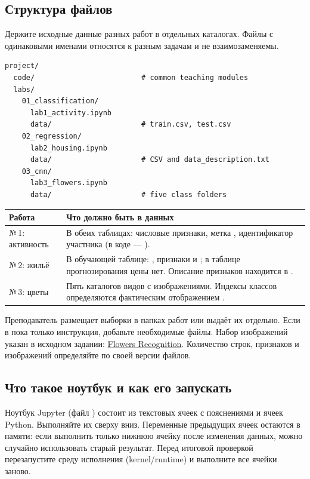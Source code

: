 \ifdefempty{\CompanionURL}{}{%
\noindent Электронное приложение к практикуму:\par
\noindent\expandafter\url\expandafter{\CompanionURL}\par\medskip}
\subsection*{Структура файлов}
Держите исходные данные разных работ в отдельных каталогах. Файлы с одинаковыми именами относятся к разным задачам и не взаимозаменяемы.
\begin{lstlisting}[language={}]
project/
  code/                         # common teaching modules
  labs/
    01_classification/
      lab1_activity.ipynb
      data/                     # train.csv, test.csv
    02_regression/
      lab2_housing.ipynb
      data/                     # CSV and data_description.txt
    03_cnn/
      lab3_flowers.ipynb
      data/                     # five class folders
\end{lstlisting}

\noindent\begin{tabularx}{\textwidth}{@{}p{}Y@{}}
\toprule
Работа & Что должно быть в данных \\
\midrule
№\,1: активность & В обеих таблицах: числовые признаки, метка , идентификатор участника (в коде --- ). \\
№\,2: жильё & В обучающей таблице: , признаки и ; в таблице прогнозирования цены нет. Описание признаков находится в . \\
№\,3: цветы & Пять каталогов видов с изображениями. Индексы классов определяются фактическим отображением . \\
\bottomrule
\end{tabularx}
\par\medskip
Преподаватель размещает выборки в папках работ или выдаёт их отдельно. Если в  пока только инструкция, добавьте необходимые файлы. Набор изображений указан в исходном задании: \href{https://www.kaggle.com/datasets/alxmamaev/flowers-recognition}{Flowers Recognition}. Количество строк, признаков и изображений определяйте по своей версии файлов.

\subsection*{Что такое ноутбук и как его запускать}
Ноутбук Jupyter (файл ) состоит из текстовых ячеек с пояснениями и ячеек Python. Выполняйте их сверху вниз. Переменные предыдущих ячеек остаются в памяти: если выполнить только нижнюю ячейку после изменения данных, можно случайно использовать старый результат. Перед итоговой проверкой перезапустите среду исполнения (kernel/runtime) и выполните все ячейки заново.

